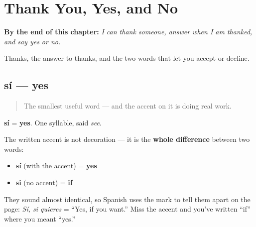 
\chapter{Thank You, Yes, and No}
\label{ch:thank-you}

\begin{chapteropening}
\textbf{By the end of this chapter:} \emph{I can thank someone, answer when I am thanked, and say yes or no.}

Thanks, the answer to thanks, and the two words that let you accept or decline.
\end{chapteropening}

\section[sí]{sí — yes}

\label{lesson:ES-C19-si}



\begin{quote}
The smallest useful word — and the accent on it is doing real work.
\end{quote}

\begin{cousinweb}
\textbf{sí} = \textbf{yes}. One syllable, said \emph{see}.

The written accent is not decoration — it is the \textbf{whole difference} between two words:

\begin{itemize}
\raggedright
  \item \textbf{sí} (with the accent) = \textbf{yes}
  \item \textbf{si} (no accent) = \textbf{if}
\end{itemize}

They sound almost identical, so Spanish uses the mark to tell them apart on the page: \emph{Sí, si quieres} = \textquotedblleft{}Yes, if you want.\textquotedblright{} Miss the accent and you've written \textquotedblleft{}if\textquotedblright{} where you meant \textquotedblleft{}yes.\textquotedblright{}
\end{cousinweb}

